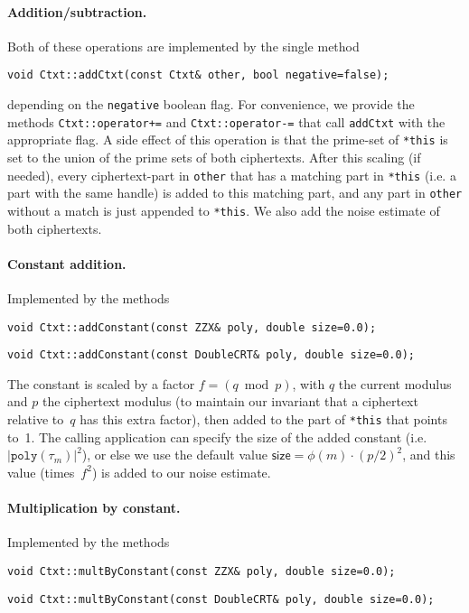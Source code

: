\documentclass[14pt]{extarticle}
\begin{document}
\paragraph{Addition/subtraction.} Both of these operations are
implemented by the single method

\texttt{void Ctxt::addCtxt(const Ctxt\& other, bool negative=false);}

\noindent
depending on the \texttt{negative} boolean flag. 
For convenience,
we provide the methods \texttt{Ctxt::operator+=} and
\texttt{Ctxt::operator-=} that call \texttt{addCtxt} with the
appropriate flag. A side effect of this
operation is that the prime-set of \texttt{*this} is set to the union
of the prime sets of both ciphertexts. After this scaling (if needed),
every ciphertext-part in \texttt{other} that has a matching part in
\texttt{*this} (i.e. a part with the same handle) is added to this
matching part, and any part in \texttt{other} without a match is just
appended to \texttt{*this}.
We also add the noise estimate of both ciphertexts. 


\paragraph{Constant addition.} Implemented by the methods

\texttt{void Ctxt::addConstant(const ZZX\& poly, double size=0.0);}

\texttt{void Ctxt::addConstant(const DoubleCRT\& poly, double size=0.0);}

\noindent
The constant is scaled by a factor $f=(q \bmod p)$, with $q$ the
current modulus and $p$ the ciphertext modulus (to maintain our
invariant that a ciphertext relative to~$q$ has this extra factor),
then added to the part of \texttt{*this} that points to~1.
The calling application can specify the size of the added constant
(i.e. $|\texttt{poly}(\tau_m)|^2$), or else we use the default value 
$\mathsf{size}=\phi(m)\cdot(p/2)^2$, and this value (times~$f^2$) is
added to our noise estimate.


\paragraph{Multiplication by constant.} Implemented by the methods

  \texttt{void Ctxt::multByConstant(const ZZX\& poly, double size=0.0);}

  \texttt{void Ctxt::multByConstant(const DoubleCRT\& poly, double size=0.0);}
\end{document}
